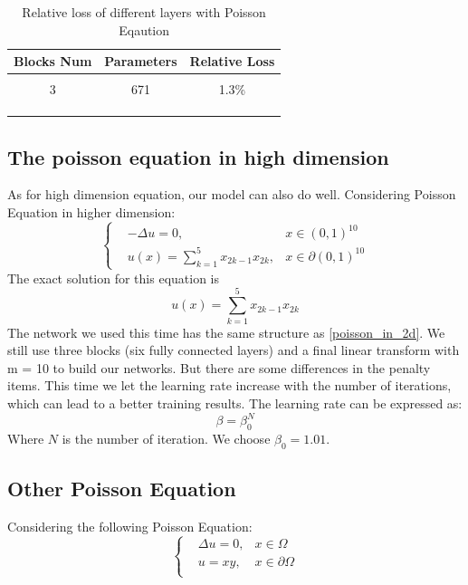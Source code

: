 \documentclass{article}
\begin{document}
\begin{table}[htbp]
\centering  
\caption{Relative loss of different layers with Poisson Eqaution}
\label{different layers of poisson equation}
\begin{tabular}{ccc} 
	\toprule  %
	Blocks Num&Parameters& Relative Loss\\
	\midrule  %
	\\3 & 671&1.3\%
	\\
	\\
	\\
	\\
	\bottomrule %
\end{tabular}
\end{table}


\subsection{The poisson equation in high dimension}
As for high dimension equation, our model can also do well. Considering Poisson Equation in higher dimension:
\begin{equation}
\left \{
\begin{aligned}
&-\Delta u =0, &x\in (0,1)^{10} \\
&u(x)=\sum\limits_{k=1}^5x_{2k-1}x_{2k}, &x\in \partial (0,1)^{10}
\end{aligned}
\right.
\end{equation}
The exact solution for this equation is 
\begin{equation}
u(x)=\sum\limits_{k=1}^5x_{2k-1}x_{2k}
\end{equation}
The network we used this time has the same structure as \ref{poisson_in_2d}. We still use three blocks (six fully connected layers) and a final linear transform with m = 10 to build our networks. But there are some differences in the penalty items. This time we let the learning rate increase with the number of iterations, which can lead to a better training results. The learning rate can be expressed as:
\begin{equation}
\beta=\beta_{0}^N
\end{equation}
Where $N$ is the number of iteration. We choose $\beta_0=1.01$.

\subsection{Other Poisson Equation}
\par Considering the following Poisson Equation:
\begin{equation}
\left\{
\begin{aligned}
& \Delta u=0, & x\in \Omega \\
 &u=xy,   &x\in \partial \Omega \\
 \end{aligned}
\right.
\end{equation}
\end{document}
